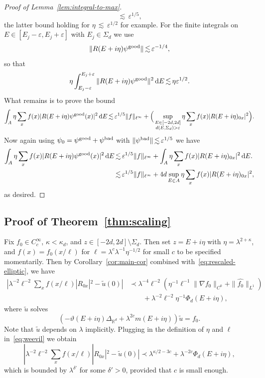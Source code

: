 \documentclass[11pt]{amsart}
\def\Real{{\mathbb R}}
\def\eps{{\varepsilon}}
\newcommand{\diff}{\mathop{}\!\mathrm{d}}
\newcommand{\Ft}[1]{{\widehat{#1}}}
\def\lsim{{\,\lesssim\,}}
\newcommand{\ldom}{\prec}
\numberwithin{equation}{section}
\numberwithin{theorem}{section}
\begin{document}
\begin{proof}[Proof of Lemma~\ref{lem:integral-to-max}]
\[\lsim \eps^{1/5} ,
\]
the latter bound holding for $\eta \lsim \eps^{1/2}$ for example.
For the finite integrals on $E\in [E_j-\eps,E_j+\eps]$ with $E_j\in\Sigma_d$ we use
\[
\|R(E+i\eta) \psi^{\rm good}\| \lsim \eps^{-1/4},
\]
so that
\[
\eta \int_{E_j-\eps}^{E_j+\eps} \|R(E+i\eta)\psi^{\rm good}\|^2 \diff E \lsim \eta \eps^{1/2}.
\]
What remains is to prove the bound
\[
\int_A \eta\sum_x f(x) |R(E+i\eta)\psi^{\rm good}(x)|^2 \diff E  \lsim
\eps^{1/5}\|f\|_{\ell^\infty}
+ \Big(\sup_{\substack{E\in [-2d,2d]\\ d(E,\Sigma_d)>\eps}}
\eta \sum_x f(x) |R(E+i\eta)_{0x}|^2 \Big).
\]
Now again using $\psi_0 = \psi^{\rm good} + \psi^{\rm bad}$ with $\|\psi^{\rm bad}\|\lsim \eps^{1/5}$
we have
\begin{align*}
\label{eq:final-calc}
\int_A \eta\sum_x f(x) |R(E+i\eta)\psi^{\rm good}(x)|^2 \diff E
&\lsim \eps^{1/5}\|f\|_{\ell^\infty} +
\int_A \eta \sum_x f(x) |R(E+i\eta)_{0x}|^2 \diff E. \\
&\lsim \eps^{1/5}\|f\|_{\ell^\infty} +
4d \sup_{E\in A} \eta \sum_x f(x)|R(E+i\eta)_{0x}|^2,
\end{align*}
as desired.

\end{proof}


\subsection{Proof of Theorem~\ref{thm:scaling}}
\label{sec:scaling-pf}

Fix $f_0\in C_c^\infty$, $\kappa<\kappa_d$, and $z\in[-2d,2d]\setminus \Sigma_d$.
Then set $z=E+i\eta$ with $\eta=\lambda^{2+\kappa}$, and
$f(x) = f_0(x/\ell)$ for $\ell = \lambda^c \lambda^{-1}\eta^{-1/2}$
for small $c$ to be specified momentarily.
Then by Corollary~\ref{cor:main-cor} combined with~\eqref{eq:rescaled-elliptic}, we have
\begin{equation}
\label{eq:weevil}
\begin{split}
|\lambda^{-2} \ell^{-2} \sum_x f(x/\ell) |R_{0x}|^2  - \tilde{u}(0)|
&\ldom \lambda^{-4}\ell^{-2}
(\eta^{-1} \ell^{-1} \|\nabla f_0\|_{C^0} + \|\Ft{f_0}\|_{L^1}) \\
&\qquad + \lambda^{-2}\ell^{-2} \eta^{-1}\Phi_d(E+i\eta),
\end{split}
\end{equation}
where $\tilde{u}$ solves
\[
(-\vartheta(E+i\eta) \Delta_{\Real^d} + \lambda^{2c} m(E+i\eta)) \tilde{u} = f_0.
\]
Note that $\tilde{u}$ depends on $\lambda$ implicitly. Plugging in the definition of $\eta$ and $\ell$ in~\eqref{eq:weevil} we obtain
\begin{equation}
\label{eq:f-scaling}
|\lambda^{-2} \ell^{-2} \sum_x f(x/\ell) |R_{0x}|^2  - \tilde{u}(0)|
\ldom  \lambda^{\kappa/2-3c} + \lambda^{-2c} \Phi_d(E+i\eta),
\end{equation}
which is bounded by $\lambda^{\delta'}$ for some $\delta'>0$, provided that $c$ is small enough.
\end{document}
